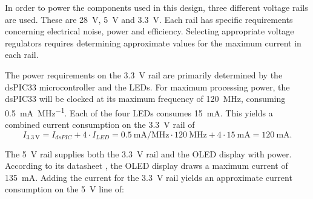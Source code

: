 \label{sec:voltage_rails}

In order to power the components  used in this design, three different voltage
rails are  used. These are \SI{28}{\volt}, \SI{5}{\volt}  and \SI{3.3}{\volt}.
Each rail  has specific  requirements concerning  electrical noise,  power and
efficiency.   Selecting appropriate  voltage  regulators requires  determining
approximate values for the maximum current in each rail.

The power requirements on the \SI{3.3}{\volt} rail are primarily determined by the
dsPIC33 microcontroller and the LEDs. For maximum processing power, the dsPIC33
will be clocked at its maximum frequency of \SI{120}{\mega\hertz}, consuming
\SI{0.5}{\milli\ampere\per\mega\hertz}. %
Each of the four LEDs consumes \SI{15}{\milli\ampere}. %
This yields a combined current consumption on the \SI{3.3}{\volt} rail of
\begin{equation}
    I_{\SI{3.3}{\volt}} = I_{dsPIC} + 4 \cdot I_{LED} = \SI{0.5}{\milli\ampere\per\mega\hertz} \cdot \SI{120}{\mega\hertz} + 4 \cdot \SI{15}{\milli\ampere} = \SI{120}{\milli\ampere}\text{.}
\end{equation}

%
%

The \SI{5}{\volt}  rail supplies  both the \SI{3.3}{\volt}  rail and  the OLED
display with power. According  to its datasheet , the OLED
display draws a maximum current of \SI{135}{\milli\ampere}. Adding the current
for the \SI{3.3}{\volt} rail yields  an approximate current consumption on the
\SI{5}{\volt} line of:

